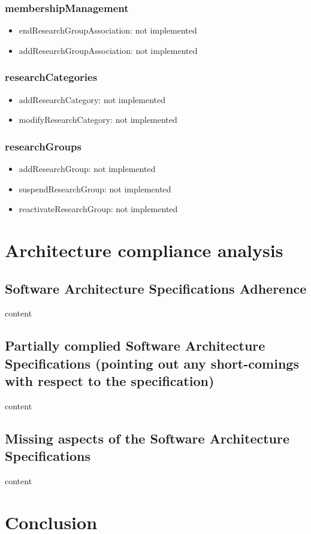 \documentclass{article}
\begin{document}
		\subsubsection{membershipManagement}
			\begin{itemize}
			\item endResearchGroupAssociation: not implemented
			\item addResearchGroupAssociation: not implemented
			\end{itemize}

		\subsubsection{researchCategories}
			\begin{itemize}
			\item addResearchCategory: not implemented
			\item modifyResearchCategory: not implemented
			\end{itemize}

		\subsubsection{researchGroups}
			\begin{itemize}
			\item addResearchGroup: not implemented
			\item suspendResearchGroup: not implemented
			\item reactivateResearchGroup: not implemented
			\end{itemize}


   \newpage

\section{Architecture compliance analysis}
     \subsection{Software Architecture Specifications Adherence}
     content

     \subsection{Partially complied Software Architecture Specifications (pointing out any short-comings with respect to the specification)}
     content

     \subsection{Missing aspects of the Software Architecture Specifications}
     content

   	\newpage

\section{Conclusion}
\end{document}
